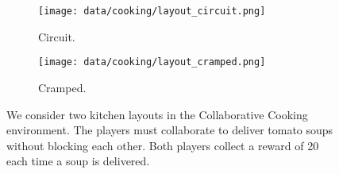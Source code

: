 
\begin{figure}
    \centering
    \begin{subfigure}[t]{0.48\linewidth}
    \texttt{[image: data/cooking/layout\_circuit.png]}
    \caption{Circuit.}
    \end{subfigure}
    \begin{subfigure}[t]{0.48\linewidth}
    \texttt{[image: data/cooking/layout\_cramped.png]}
    \caption{Cramped.}
    \end{subfigure}
    \vspace{-0.1cm}
    \caption{We consider two kitchen layouts in the Collaborative Cooking environment. The players must collaborate to deliver tomato soups without blocking each other. Both players collect a reward of 20 each time a soup is delivered.}
    \label{fig:layouts}
\end{figure}